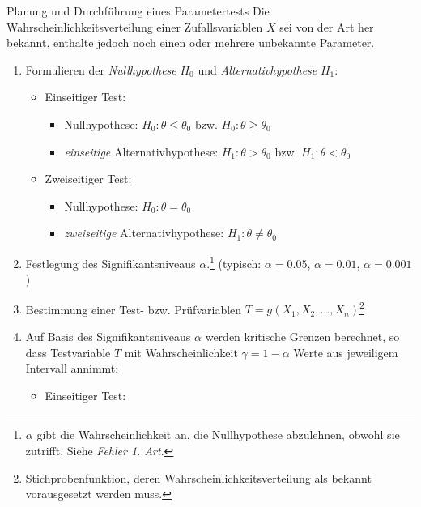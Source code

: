 \begin{algo}{Planung und Durchführung eines Parametertests}
    Die Wahrscheinlichkeitsverteilung einer Zufallsvariablen $X$ sei von der Art her bekannt, enthalte jedoch noch einen oder mehrere unbekannte Parameter.

    \begin{enumerate}
        \item Formulieren der \emph{Nullhypothese} $H_0$ und \emph{Alternativhypothese} $H_1$:
              \begin{itemize}
                  \item Einseitiger Test:
                        \begin{itemize}
                            \item Nullhypothese: $H_0: \theta \leq \theta_0$ bzw. $H_0: \theta \geq \theta_0$
                            \item \emph{einseitige} Alternativhypothese: $H_1: \theta > \theta_0$ bzw. $H_1: \theta < \theta_0$
                        \end{itemize}
                  \item Zweiseitiger Test:
                        \begin{itemize}
                            \item Nullhypothese: $H_0: \theta = \theta_0$
                            \item \emph{zweiseitige} Alternativhypothese: $H_1: \theta \neq \theta_0$
                        \end{itemize}
              \end{itemize}
        \item Festlegung des Signifikantsniveaus $\alpha$.\footnote{$\alpha$ gibt die Wahrscheinlichkeit an, die Nullhypothese abzulehnen, obwohl sie zutrifft. Siehe \emph{Fehler 1. Art}.}
              (typisch: $\alpha = 0.05$, $\alpha = 0.01$, $\alpha = 0.001$)
        \item Bestimmung einer Test- bzw. Prüfvariablen $T = g(X_1, X_2, \ldots, X_n)$\footnote{Stichprobenfunktion, deren Wahrscheinlichkeitsverteilung als bekannt vorausgesetzt werden muss.}
        \item Auf Basis des Signifikantsniveaus $\alpha$ werden kritische Grenzen berechnet, so dass Testvariable $T$ mit Wahrscheinlichkeit $\gamma = 1 - \alpha$ Werte aus jeweiligem Intervall annimmt:
              \begin{itemize}
                  \item Einseitiger Test:

\end{itemize}
\end{enumerate}
\end{algo}
